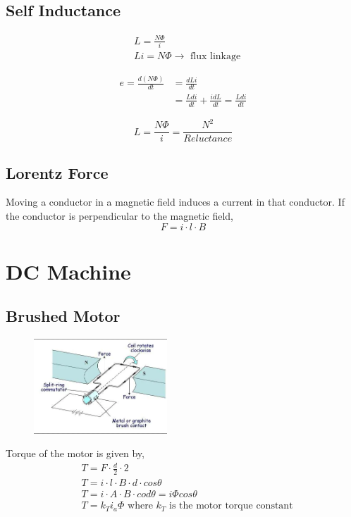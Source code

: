 \documentclass{article}
\begin{document}
    \subsection*{Self Inductance}
    \begin{align*}
        &L = \frac{N\Phi}{i}\\
        &Li = N\Phi \rightarrow \text{ flux linkage}
    \end{align*}

    \begin{align*}
        e = \frac{d(N\Phi)}{dt} &= \frac{dLi}{dt}\\
        & = \frac{Ldi}{dt} + \frac{idL}{dt} = \frac{Ldi}{dt}
    \end{align*}

    \begin{equation*}
        L = \frac{N \Phi }{i} = \frac{N^2}{Reluctance}
    \end{equation*}

    \subsection*{Lorentz Force}
    Moving a conductor in a magnetic field induces a current in that conductor.
    If the conductor is perpendicular to the magnetic field,
    \begin{equation*}
        F = i \cdot l \cdot B
    \end{equation*}


    \section*{DC Machine}
    \subsection*{Brushed Motor}

    \begin{figure}[H]
            \centering
            \includegraphics[width=5cm]{figures/brushed_motor.png}
    \end{figure}

    Torque of the motor is given by,
    \begin{align*}
        &T = F \cdot \frac{d}{2} \cdot 2\\
        &T = i\cdot l \cdot B \cdot d \cdot cos \theta \\
        &T = i \cdot A \cdot B \cdot cod \theta = i \Phi cos\theta\\
        &T = k_{T}i_{a} \Phi \text{ where $k_{T}$ is the motor torque constant}
    \end{align*}
\end{document}
